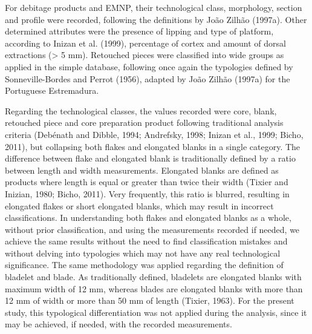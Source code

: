 \documentclass[12pt,twoside]{reedthesis}
\begin{document}
For debitage products and EMNP, their technological class, morphology, section and profile were recorded, following the definitions by João Zilhão (1997a). Other determined attributes were the presence of lipping and type of platform, according to Inizan et al. (1999), percentage of cortex and amount of dorsal extractions (\textgreater{} 5 mm). Retouched pieces were classified into wide groups as applied in the simple database, following once again the typologies defined by Sonneville-Bordes and Perrot (1956), adapted by João Zilhão (1997a) for the Portuguese Estremadura.

Regarding the technological classes, the values recorded were core, blank, retouched piece and core preparation product following traditional analysis criteria (Debénath and Dibble, 1994; Andrefsky, 1998; Inizan et al., 1999; Bicho, 2011), but collapsing both flakes and elongated blanks in a single category. The difference between flake and elongated blank is traditionally defined by a ratio between length and width measurements. Elongated blanks are defined as products where length is equal or greater than twice their width (Tixier and Inizian, 1980; Bicho, 2011). Very frequently, this ratio is blurred, resulting in elongated flakes or short elongated blanks, which may result in incorrect classifications. In understanding both flakes and elongated blanks as a whole, without prior classification, and using the measurements recorded if needed, we achieve the same results without the need to find classification mistakes and without delving into typologies which may not have any real technological significance. The same methodology was applied regarding the definition of bladelet and blade. As traditionally defined, bladelets are elongated blanks with maximum width of 12 mm, whereas blades are elongated blanks with more than 12 mm of width or more than 50 mm of length (Tixier, 1963). For the present study, this typological differentiation was not applied during the analysis, since it may be achieved, if needed, with the recorded measurements.
\end{document}
